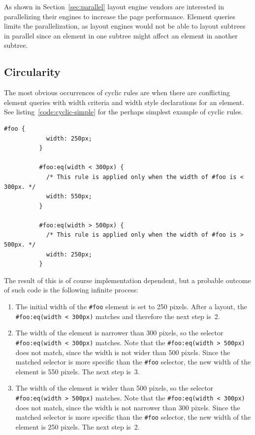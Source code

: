 \documentclass[a4paper,11pt]{kth-mag}
\newcommand{\code}[1]{\texttt{#1}}
\begin{document}
        As shown in Section~\ref{sec:parallel} \gls{layout engine} vendors are interested in parallelizing their engines to increase the page performance.
        Element queries limits the parallelization, as \glspl{layout engine} would not be able to layout subtrees in parallel since an \gls{element} in one subtree might affect an \gls{element} in another subtree.

      \subsection{Circularity}\label{sec:cyclic-rules}
        The most obvious occurrences of cyclic rules are when there are conflicting element queries with width criteria and width style declarations for an \gls{element}.
        See listing~\ref{code:cyclic-simple} for the perhaps simplest example of cyclic rules.
        \begin{lstlisting}[gobble=10,caption={Simple example of cyclic rules with directly conflicting width element queries criteria and declarations. Recall the element queries pseudo-syntax defined in Section~\ref{sec:eq-definitions}.}, captionpos=b, label={code:cyclic-simple}]
          #foo {
            width: 250px;
          }

          #foo:eq(width < 300px) {
            /* This rule is applied only when the width of #foo is < 300px. */
            width: 550px;
          }

          #foo:eq(width > 500px) {
            /* This rule is applied only when the width of #foo is > 500px. */
            width: 250px;
          }
        \end{lstlisting}
        The result of this is of course implementation dependent, but a probable outcome of such code is the following infinite process:
        \begin{enumerate}
          \item 
            The initial width of the \code{\#foo} \gls{element} is set to 250 pixels.
            After a layout, the \code{\#foo:eq(width < 300px)} matches and therefore the next step is~2.
          \item 
            The width of the \gls{element} is narrower than 300 pixels, so the selector \code{\#foo:eq(width < 300px)} matches.
            Note that the \code{\#foo:eq(width > 500px)} does not match, since the width is not wider than 500 pixels.
            Since the matched selector is more specific than the \code{\#foo} selector, the new width of the \gls{element} is 550 pixels.
            The next step is~3.
          \item 
            The width of the \gls{element} is wider than 500 pixels, so the selector \code{\#foo:eq(width > 500px)} matches.
            Note that the \code{\#foo:eq(width < 300px)} does not match, since the width is not narrower than 300 pixels.
            Since the matched selector is more specific than the \code{\#foo} selector, the new width of the \gls{element} is 250 pixels.
            The next step is~2.
        \end{enumerate}
\end{document}
